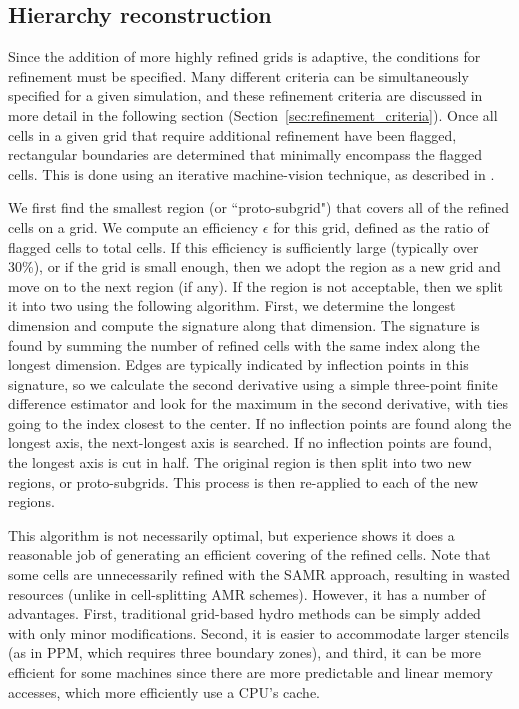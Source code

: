 \subsection{Hierarchy reconstruction}
\label{sec:hierarchy_reconstruction}

Since the addition of more highly refined grids is adaptive, the conditions for refinement must be specified. Many different criteria can be simultaneously specified for a given simulation, and these refinement criteria are discussed in more detail in the following section (Section~\ref{sec:refinement_criteria}).   Once all cells in a given grid that require additional refinement have been flagged, rectangular boundaries are determined that minimally encompass the flagged cells.  This is done using an iterative machine-vision technique, as described in \cite{Berger91}.

We first find the smallest region (or ``proto-subgrid") that covers all of the refined cells on a grid.  We compute an efficiency $\epsilon$ for this grid, defined as the ratio of flagged cells to total cells.  If this efficiency is sufficiently large (typically over 30\%), or if the grid is small enough, then we adopt the region as a new grid and move on to the next region (if any).  If the region is not acceptable, then we split it into two using the following algorithm.  First, we determine the longest dimension and compute the signature along that dimension.  The signature is found by summing the number of refined cells with the same index along the longest dimension.  Edges are typically indicated by inflection points in this signature, so we calculate the second derivative using a simple three-point finite difference estimator and look for the maximum in the second derivative, with ties going to the index closest to the center.  If no inflection points are found along the longest axis, the next-longest axis is searched.  If no inflection points are found, the longest axis is cut in half.  The original region is then split into two new regions, or proto-subgrids.  This process is then re-applied to each of the new regions.

This algorithm is not necessarily optimal, but experience shows it does a reasonable job of generating an efficient covering of the refined cells.  Note that some cells are unnecessarily refined with the SAMR approach, resulting in wasted resources (unlike in cell-splitting AMR schemes).  However, it has a number of advantages.  First, traditional grid-based hydro methods can be simply added with only minor modifications.  Second, it is easier to accommodate larger stencils (as in PPM, which requires three boundary zones), and third, it can be more efficient for some machines since there are more predictable and linear memory accesses, which more efficiently use a CPU's cache.


